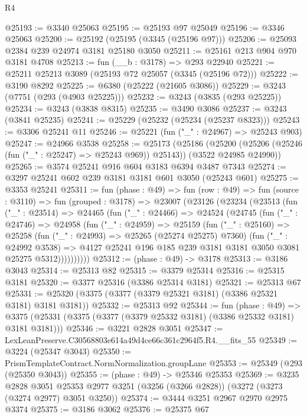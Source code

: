 \begin{lexlean}{R4}
\begin{coremodule}
@25193 := @3340 @25063
@25195 := @25193 @97 @25049
@25196 := @3346 @25063
@25200 := @25192 (@25195 (@3345 (@25196 @97)))
@25206 := @25093 @2384 @239 @24974 @3181 @25180 @3050
@25211 := @25161 @213 @904 @970 @3181 @4708
@25213 := fun (__b : @3178) => @293 @22940
@25221 := @25211 @25213 @3089 (@25193 @72 @25057 (@3345 (@25196 @72)))
@25222 := @3190 @8292
@25225 := @6380 (@25222 (@21605 @3086))
@25229 := @3243 (@7751 (@293 (@4903 @25225)))
@25232 := @3243 (@3835 (@293 @25225))
@25234 := @3243 (@3838 @8315)
@25235 := @3490 @3086
@25237 := @3243 (@3841 @25235)
@25241 := @25229 (@25232 (@25234 (@25237 @8323)))
@25243 := @3306 @25241 @11
@25246 := @25221 (fun ("_" : @24967) => @25243 @903)
@25247 := @24966 @3538
@25258 := @25173
    (@25186
      (@25200 (@25206 (@25246 (fun ("_" : @25247) => @25243 @969)) @25143))
      (@3522 @24985 @24990))
@25265 := @3574 @25241 @916 @604 @3183 @6394 @3487 @7343
@25274 := @3297 @25241 @602 @239 @3181 @3181 @601 @3050 (@25243 @601)
@25275 := @3353 @25241
@25311 := fun (phase : @49) =>
  fun (row : @49) =>
  fun (source : @3110) =>
  fun (grouped : @3178) =>
  @23007
    (@23126
      (@23234
        (@23513
          (fun ("_" : @23514) =>
          @24465
            (fun ("_" : @24466) =>
            @24524
              (@24745
                (fun ("_" : @24746) =>
                @24958
                  (fun ("_" : @24959) =>
                  @25159
                    (fun ("_" : @25160) =>
                    @25258
                      (fun ("_" : @24993) => @25265 (@25274 @25275) @7360)
                      (fun ("_" : @24992 @3538) =>
                      @4127 @25241 @196 @185 @239 @3181 @3181 @3050 @3081 @25275 @5312))))))))))
@25312 := (phase : @49) -> @3178
@25313 := @3186 @3043
@25314 := @25313 @82
@25315 := @3379 @25314
@25316 := @25315 @3181
@25320 := @3377 @25316 (@3386 @25314 @3181)
@25321 := @25313 @67
@25331 := @25320 (@3375 (@3377 (@3379 @25321 @3181) (@3386 @25321 @3181) @3181 @3181))
@25332 := @25313 @92
@25344 := fun (phase : @49) =>
  @3375 (@25331 (@3375 (@3377 (@3379 @25332 @3181) (@3386 @25332 @3181) @3181 @3181)))
@25346 := @3221 @2828 @3051
@25347 := LexLeanPreserve.C30568803e614a49d4ce66c361c2964f5.R4.__fits_55
@25349 := @3224 (@25347 @3043)
@25350 := PrismTemplateContract.NormNormalization.groupLane
@25353 := @25349 (@293 (@25350 @3043))
@25355 := (phase : @49) -> @25346 @25353
@25369 := @3235
    @2828
    @3051
    @25353
    @2977
    @3251
    (@3256 (@3266 @2828))
    (@3272 (@3273 (@3274 @2977) @3051 @3250))
@25374 := @3444 @3251 @2967 @2970 @2975 @3374
@25375 := @3186 @3062
@25376 := @25375 @67

\end{coremodule}
\end{lexlean}

